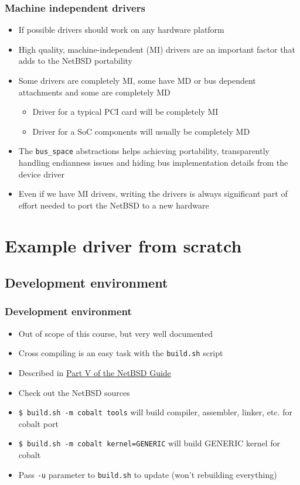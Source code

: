 \documentclass[dvipsnames,table]{beamer}
\begin{document}
\begin{frame}
\frametitle{Machine independent drivers}

\begin{itemize}
	\item If possible drivers should work on any hardware platform
	\item High quality, machine-independent (MI) drivers are an important factor that adds to the NetBSD portability
	\item Some drivers are completely MI, some have MD or bus dependent attachments and some are completely MD
	\begin{itemize}
		\item Driver for a typical PCI card will be completely MI
		\item Driver for a SoC components will usually be completely MD
	\end{itemize}
	\item The {\tt bus\_space} abstractions helps achieving portability, transparently handling endianness issues and hiding bus implementation details from the device driver
	\item Even if we have MI drivers, writing the drivers is always significant part of effort needed to port the NetBSD to a new hardware
\end{itemize}
\end{frame}


\section{Example driver from scratch}

\subsection{Development environment}

\begin{frame}
\frametitle{Development environment}
\begin{itemize}
	\item Out of scope of this course, but very well documented
	\item Cross compiling is an easy task with the {\tt build.sh} script
	\item Described in \href{http://www.netbsd.org/docs/guide/en/part-compile.html}{Part V of the NetBSD Guide}
	\item Check out the NetBSD sources
	\item {\tt \$ build.sh -m cobalt tools} will build compiler, assembler, linker, etc. for cobalt port
	\item {\tt \$ build.sh -m cobalt kernel=GENERIC} will build GENERIC kernel for cobalt
	\item Pass {\tt -u} parameter to {\tt build.sh} to update (won't rebuilding everything)
\end{itemize}
\end{frame}
\end{document}
